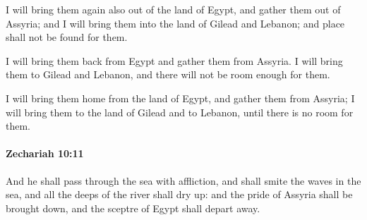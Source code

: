 			\begin{versebox}
					\item[BHS] 
					\item[LXX] 
					\item[ASV] I will bring them again also out of the land of Egypt, and gather them out of Assyria; and I will bring them into the land of Gilead and Lebanon; and place shall not be found for them.
					\item[NIV] I will bring them back from Egypt and gather them from Assyria. I will bring them to Gilead and Lebanon, and there will not be room enough for them.
					\item[NRSV] I will bring them home from the land of Egypt, and gather them from Assyria; I will bring them to the land of Gilead and to Lebanon, until there is no room for them.
			\end{versebox}

		\paragraph{Zechariah 10:11} %
			\label{ZECHARIAH-10-11}

			And he shall pass through the sea with affliction, and shall smite the waves in the sea, and all the deeps of the river shall dry up: and the pride of Assyria shall be brought down, and the sceptre of Egypt shall depart away.

